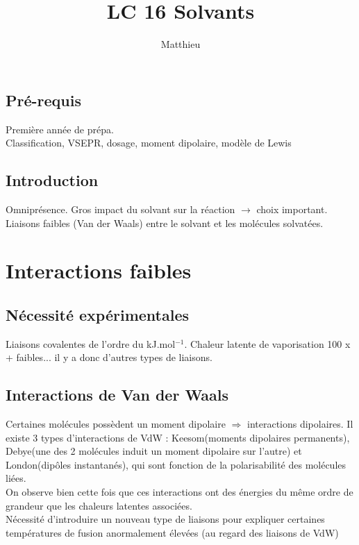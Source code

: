 \documentclass[12pt,prb,aps,epsf]{article}
\begin{document}
	
	\title{LC 16 Solvants}
	\author{Matthieu}
	
	\maketitle
	
	\tableofcontents
	
	\pagebreak
	
	
\subsection{Pré-requis}
Première année de prépa.\\
Classification, VSEPR, dosage, moment dipolaire, modèle de Lewis

\subsection{Introduction}
Omniprésence. Gros impact du solvant sur la réaction $\rightarrow$ choix important. Liaisons faibles (Van der Waals) entre le solvant et les molécules solvatées.

\section{Interactions faibles}
\subsection{Nécessité expérimentales}
Liaisons covalentes de l'ordre du kJ.mol$^{-1}$. Chaleur latente de vaporisation 100 x + faibles... il y a donc d'autres types de liaisons.

\subsection{Interactions de Van der Waals}
Certaines molécules possèdent un moment dipolaire $\Rightarrow$ interactions dipolaires. Il existe 3 types d'interactions de VdW : Keesom(moments dipolaires permanents), Debye(une des 2 molécules induit un moment dipolaire sur l'autre) et London(dipôles instantanés), qui sont fonction de la polarisabilité des molécules liées.\\
On observe bien cette fois que ces interactions ont des énergies du même ordre de grandeur que les chaleurs latentes associées.\\

Nécessité d'introduire un nouveau type de liaisons pour expliquer certaines températures de fusion anormalement élevées (au regard des liaisons de VdW)
\end{document}
